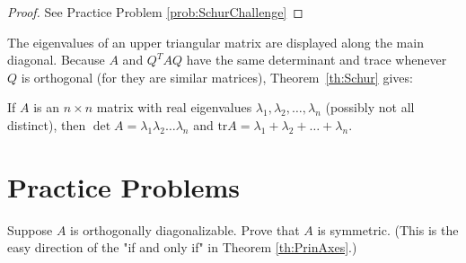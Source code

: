 \documentclass{ximera}
\begin{document}
\begin{proof}
See Practice Problem \ref{prob:SchurChallenge}
\end{proof}

The eigenvalues of an upper triangular matrix are displayed along the main diagonal. Because $A$ and $Q^{T}AQ$ have the same determinant and trace whenever $Q$ is orthogonal (for they are similar matrices), Theorem~\ref{th:Schur} gives:

\begin{corollary}\label{cor:det_and_tr}
If $A$ is an $n \times n$ matrix with real eigenvalues $\lambda_{1}, \lambda_{2}, \dots, \lambda_{n}$ (possibly not all distinct), then $\det A = \lambda_{1}\lambda_{2} \dots \lambda_{n}$ and $\mbox{tr} A = \lambda_{1} + \lambda_{2} + \dots  + \lambda_{n}$.
\end{corollary}

\section*{Practice Problems}

\begin{problem}\label{prob:ortho_diag_implies_symmetric}
Suppose $A$ is orthogonally diagonalizable.  Prove that $A$ is symmetric.  (This is the easy direction of the "if and only if" in Theorem \ref{th:PrinAxes}.)
\end{problem}
\end{document}
